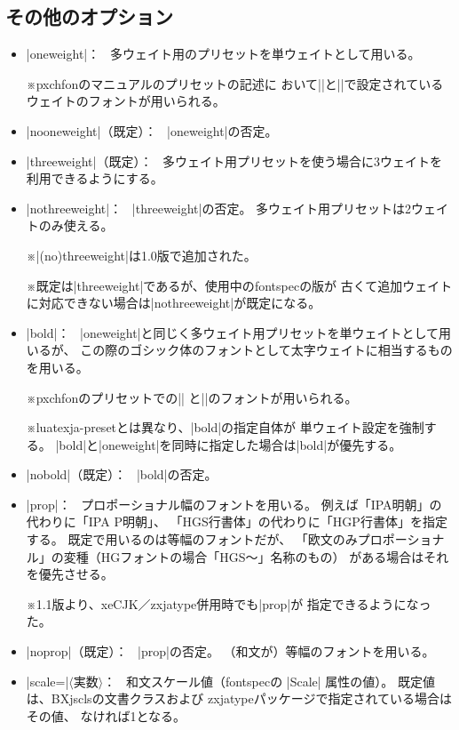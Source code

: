 \documentclass[xelatex,ja=standard,jafont=ipaex,
  a4paper]{bxjsarticle}
\newcommand{\Pkg}[1]{\textsf{#1}}
\newcommand{\Meta}[1]{$\langle$\mbox{}#1\mbox{}$\rangle$}
\newcommand{\Note}{\par\noindent ※}
\newcommand{\Means}{：\ }
\newcommand{\JSl}{\mbox{／}\linebreak[0]}
\begin{document}
\subsection{その他のオプション}
\label{ssec:Other-Option}

\begin{itemize}
\item |oneweight|\Means
多ウェイト用のプリセットを単ウェイトとして用いる。
\Note \Pkg{pxchfon}のマニュアルのプリセットの記述に
おいて\>|\setminchofont|\>と\>|\setgothicfont|\>で設定されている
ウェイトのフォントが用いられる。
\item |nooneweight|（既定）\Means
|oneweight|\>の否定。

\item |threeweight|（既定）\Means
多ウェイト用プリセットを使う場合に3ウェイトを利用できるようにする。
\item |nothreeweight|\Means
|threeweight|\>の否定。
多ウェイト用プリセットは2ウェイトのみ使える。
\Note |(no)threeweight|\>は1.0版で追加された。
\Note 既定は\>|threeweight|\>であるが、使用中の\Pkg{fontspec}の版が
古くて追加ウェイトに対応できない場合は\>|nothreeweight|\>が既定になる。

\item |bold|\Means
|oneweight|\>と同じく多ウェイト用プリセットを単ウェイトとして用いるが、
この際のゴシック体のフォントとして太字ウェイトに相当するものを用いる。
\Note \Pkg{pxchfon}のプリセットでの\>|\setminchofont|\>%
と\>|\setboldgothicfont|\>のフォントが用いられる。
\Note \Pkg{luatexja-preset}とは異なり、|bold|\>の指定自体が
単ウェイト設定を強制する。
|bold|\>と\>|oneweight|\>を同時に指定した場合は\>|bold|\>が優先する。
\item |nobold|（既定）\Means
|bold|\>の否定。

\item |prop|\Means
プロポーショナル幅のフォントを用いる。
例えば「IPA明朝」の代わりに「IPA P明朝」、
「HGS行書体」の代わりに「HGP行書体」を指定する。
既定で用いるのは等幅のフォントだが、
「欧文のみプロポーショナル」の変種（HGフォントの場合「HGS～」名称のもの）
がある場合はそれを優先させる。
\Note 1.1版より、\Pkg{xeCJK}\JSl\Pkg{zxjatype}併用時でも\>|prop|\>が
指定できるようになった。
\item |noprop|（既定）\Means
|prop|\>の否定。
（和文が）等幅のフォントを用いる。

\item |scale=|\Meta{実数}\Means
和文スケール値（\Pkg{fontspec}の |Scale| 属性の値）。
既定値は、\Pkg{BXjscls}の文書クラスおよび
\Pkg{zxjatype}パッケージで指定されている場合はその値、
なければ1となる。


\end{itemize}
\end{document}
